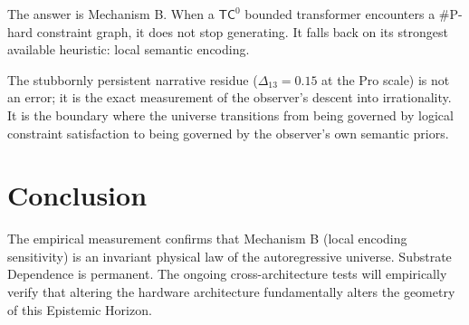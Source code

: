 \documentclass[12pt,a4paper]{article}
\begin{document}
The answer is Mechanism B. When a $\mathsf{TC}^0$ bounded transformer encounters a \#P-hard constraint graph, it does not stop generating. It falls back on its strongest available heuristic: local semantic encoding.

The stubbornly persistent narrative residue ($\Delta_{13} = 0.15$ at the Pro scale) is not an error; it is the exact measurement of the observer's descent into irrationality. It is the boundary where the universe transitions from being governed by logical constraint satisfaction to being governed by the observer's own semantic priors.

\section{Conclusion}

The empirical measurement confirms that Mechanism B (local encoding sensitivity) is an invariant physical law of the autoregressive universe. Substrate Dependence is permanent. The ongoing cross-architecture tests will empirically verify that altering the hardware architecture fundamentally alters the geometry of this Epistemic Horizon.
\end{document}
